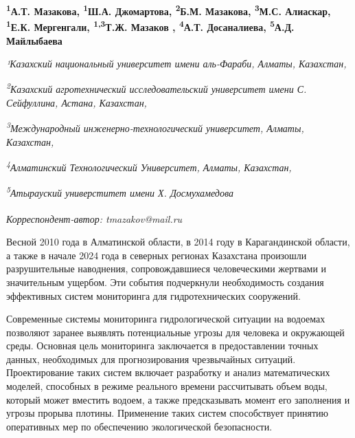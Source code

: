 
\begin{articleheader}

{\bfseries
\textsuperscript{1}А.Т. Мазакова,
\textsuperscript{1}Ш.А. Джомартова,
\textsuperscript{2}Б.М. Мазакова,
\textsuperscript{3}М.С. Алиаскар,
\textsuperscript{1}Е.К. Мергенгали,
\textsuperscript{1,3}Т.Ж. Мазаков\textsuperscript{\envelope } ,
\textsuperscript{4}А.Т. Досаналиева,
\textsuperscript{5}А.Д. Майлыбаева}
\end{articleheader}

\begin{affiliation}
\emph{¹Казахский национальный университет имени аль-Фараби, Алматы, Казахстан,}

\emph{\textsuperscript{2}Казахский агротехнический исследовательский университет имени С. Сейфуллина, Астана, Казахстан,}

\emph{\textsuperscript{3}Международный инженерно-технологический университет, Алматы, Казахстан,}

\emph{\textsuperscript{4}Алматинский Технологический Университет, Алматы, Казахстан,}

\emph{\textsuperscript{5}Атырауский универститет имени Х. Досмухамедова}

\raggedright \textsuperscript{\envelope }\emph{Корреспондент-автор: tmazakov@mail.ru}
\end{affiliation}

Весной 2010 года в Алматинской области, в 2014 году в Карагандинской
области, а также в начале 2024 года в северных регионах Казахстана
произошли разрушительные наводнения, сопровождавшиеся человеческими
жертвами и значительным ущербом. Эти события подчеркнули необходимость
создания эффективных систем мониторинга для гидротехнических сооружений.

Современные системы мониторинга гидрологической ситуации на водоемах
позволяют заранее выявлять потенциальные угрозы для человека и
окружающей среды. Основная цель мониторинга заключается в предоставлении
точных данных, необходимых для прогнозирования чрезвычайных ситуаций.
Проектирование таких систем включает разработку и анализ математических
моделей, способных в режиме реального времени рассчитывать объем воды,
который может вместить водоем, а также предсказывать момент его
заполнения и угрозы прорыва плотины. Применение таких систем
способствует принятию оперативных мер по обеспечению экологической
безопасности.

